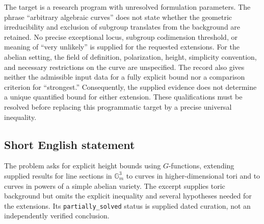 \documentclass[11pt]{article}
\begin{document}
The target is a research program with unresolved formulation parameters. The phrase ``arbitrary algebraic curves'' does not state whether the geometric irreducibility and exclusion of subgroup translates from the background are retained. No precise exceptional locus, subgroup codimension threshold, or meaning of ``very unlikely'' is supplied for the requested extensions. For the abelian setting, the field of definition, polarization, height, simplicity convention, and necessary restrictions on the curve are unspecified. The record also gives neither the admissible input data for a fully explicit bound nor a comparison criterion for ``strongest.'' Consequently, the supplied evidence does not determine a unique quantified bound for either extension. These qualifications must be resolved before replacing this programmatic target by a precise universal inequality.
\subsection{Short English statement}
The problem asks for explicit height bounds using \(G\)-functions, extending supplied results for line sections in \(\mathbb{G}_m^3\) to curves in higher-dimensional tori and to curves in powers of a simple abelian variety. The excerpt supplies toric background but omits the explicit inequality and several hypotheses needed for the extensions. Its \texttt{partially\_solved} status is supplied dated curation, not an independently verified conclusion.
\end{document}
